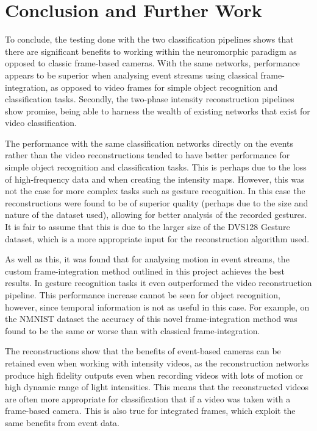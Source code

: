 \chapter{Conclusion and Further Work} \label{chap:conclusion_and_further_work}

To conclude, the testing done with the two classification pipelines shows that there are significant benefits to working within the neuromorphic paradigm as opposed to classic frame-based cameras. With the same networks, performance appears to be superior when analysing event streams using classical frame-integration, as opposed to video frames for simple object recognition and classification tasks. Secondly, the two-phase intensity reconstruction pipelines show promise, being able to harness the wealth of existing networks that exist for video classification. 

The performance with the same classification networks directly on the events rather than the video reconstructions tended to have better performance for simple object recognition and classification tasks. This is perhaps due to the loss of high-frequency data and when creating the intensity maps. However, this was not the case for more complex tasks such as gesture recognition. In this case the reconstructions were found to be of superior quality (perhaps due to the size and nature of the dataset used), allowing for better analysis of the recorded gestures. It is fair to assume that this is due to the larger size of the DVS128 Gesture dataset, which is a more appropriate input for the reconstruction algorithm used.

As well as this, it was found that for analysing motion in event streams, the custom frame-integration method outlined in this project achieves the best results. In gesture recognition tasks it even outperformed the video reconstruction pipeline. This performance increase cannot be seen for object recognition, however, since temporal information is not as useful in this case. For example, on the NMNIST dataset the accuracy of this novel frame-integration method was found to be the same or worse than with classical frame-integration.

The reconstructions show that the benefits of event-based cameras can be retained even when working with intensity videos, as the reconstruction networks produce high fidelity outputs even when recording videos with lots of motion or high dynamic range of light intensities. This means that the reconstructed videos are often more appropriate for classification that if a video was taken with a frame-based camera. This is also true for integrated frames, which exploit the same benefits from event data.

